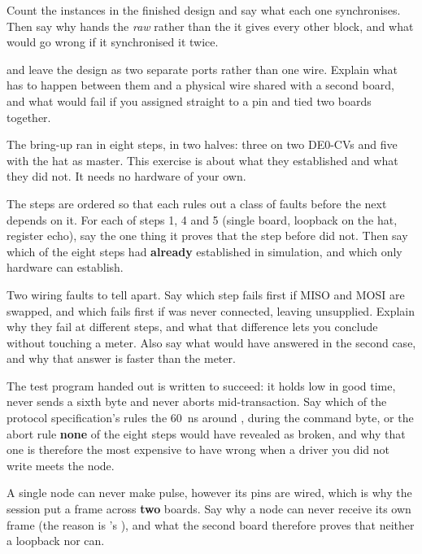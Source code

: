  Count the  instances in the finished design and say what each one
synchronises. Then say why  hands  the \emph{raw}
 rather than the  it gives every other block, and what would go wrong
if it synchronised it twice.

  and  leave the design as two separate ports rather than one wire.
Explain what has to happen between them and a physical wire shared with a second board, and what would
fail if you assigned  straight to a pin and tied two boards together.

\label{c19:ex:board}
The bring-up ran in eight steps, in two halves: three on two DE0-CVs and five with the hat as master.
This exercise is about what they established and what they did not. It needs no hardware of your own.

 The steps are ordered so that each rules out a class of faults before the next depends on
it. For each of steps 1, 4 and 5 (single board, loopback on the hat, register echo), say the one thing
it proves that the step before did not. Then say which of the eight steps  had
\textbf{already} established in simulation, and which only hardware can establish.

 Two wiring faults to tell apart. Say which step fails first if MISO and MOSI are swapped,
and which fails first if  was never connected, leaving  unsupplied. Explain
why they fail at different steps, and what that difference lets you conclude without touching a meter.
Also say what  would have answered in the second case, and why that answer is faster
than the meter.

 The test program handed out is written to succeed: it holds  low in good time,
never sends a sixth byte and never aborts mid-transaction. Say which of the protocol specification's
rules \textemdash{} the 60~ns around ,  during the command byte, or the abort rule
\textemdash{} \textbf{none} of the eight steps would have revealed as broken, and why that one is
therefore the most expensive to have wrong when a driver you did not write meets the node.

 A single node can never make  pulse, however its pins are wired, which is why
the session put a frame across \textbf{two} boards. Say why a node can never receive its own frame
(the reason is 's ), and what the second board therefore proves that
neither a loopback nor  can.

